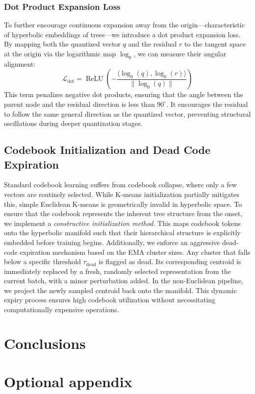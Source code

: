 \documentclass[12pt]{report}
\begin{document}
\subsection{Dot Product Expansion Loss}
To further encourage continuous expansion away from the origin---characteristic of hyperbolic embeddings of trees---we introduce a dot product expansion loss. By mapping both the quantized vector $q$ and the residual $r$ to the tangent space at the origin via the logarithmic map $\log_0$, we can measure their angular alignment:
\begin{equation}
    \mathcal{L}_{\text{dot}} = \operatorname{ReLU} \left( - \frac{\langle \log_0(q), \log_0(r) \rangle}{\| \log_0(q) \|} \right)
\end{equation}
This term penalizes negative dot products, ensuring that the angle between the parent node and the residual direction is less than $90^\circ$. It encourages the residual to follow the same general direction as the quantized vector, preventing structural oscillations during deeper quantization stages.

\section{Codebook Initialization and Dead Code Expiration}
Standard codebook learning suffers from codebook collapse, where only a few vectors are routinely selected. While K-means initialization partially mitigates this, simple Euclidean K-means is geometrically invalid in hyperbolic space. 
To ensure that the codebook represents the inherent tree structure from the onset, we implement a \textit{constructive initialization method}. This maps codebook tokens onto the hyperbolic manifold such that their hierarchical structure is explicitly embedded before training begins. 
Additionally, we enforce an aggressive dead-code expiration mechanism based on the EMA cluster sizes. Any cluster that falls below a specific threshold $\tau_{\text{dead}}$ is flagged as dead. Its corresponding centroid is immediately replaced by a fresh, randomly selected representation from the current batch, with a minor perturbation added. In the non-Euclidean pipeline, we project the newly sampled centroid back onto the manifold. This dynamic expiry process ensures high codebook utilization without necessitating computationally expensive operations.



\chapter{Conclusions}


\appendix
\chapter{Optional appendix}



\end{document}
